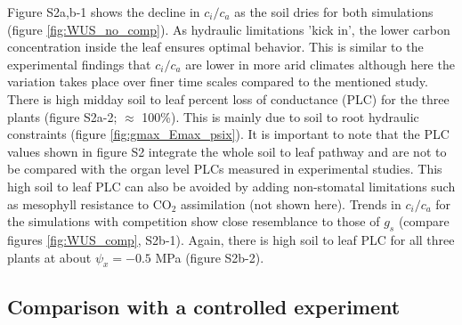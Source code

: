 \documentclass[utf8]{frontiersSCNS} %
\begin{document}
Figure S2a,b-1 shows the decline in $c_i / c_a$ as the soil dries for both simulations (figure \ref{fig:WUS_no_comp}). As hydraulic limitations 'kick in', the lower carbon concentration inside the leaf ensures optimal behavior. This is similar to the experimental findings that $c_i / c_a$ are lower in more arid climates \citep{prentice2014balancing} although here the variation takes place over finer time scales compared to the mentioned study. There is high midday soil to leaf percent loss of conductance (PLC) for the three plants (figure S2a-2; $\approx$ 100\%). This is mainly due to soil to root hydraulic constraints (figure \ref{fig:gmax_Emax_psix}). It is important to note that the PLC values shown in figure S2 integrate the whole soil to leaf pathway and are not to be compared with the organ level PLCs measured in experimental studies. This high soil to leaf PLC can also be avoided by adding non-stomatal limitations such as mesophyll resistance to CO$_2$ assimilation (not shown here). Trends in $c_i / c_a$ for the simulations with competition show close resemblance to those of $g_s$ (compare figures \ref{fig:WUS_comp}, S2b-1). Again, there is high soil to leaf PLC for all three plants at about $\psi_x = -0.5$ MPa (figure S2b-2). 

\subsection{Comparison with a controlled experiment}
\end{document}
